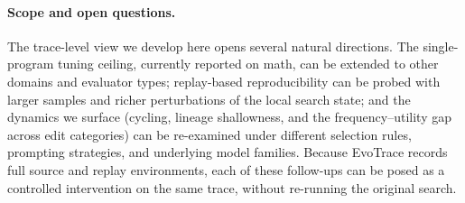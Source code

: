 \paragraph{Scope and open questions.}
The trace-level view we develop here opens several natural directions. The single-program tuning ceiling, currently reported on math, can be extended to other domains and evaluator types; replay-based reproducibility can be probed with larger samples and richer perturbations of the local search state; and the dynamics we surface (cycling, lineage shallowness, and the frequency--utility gap across edit categories) can be re-examined under different selection rules, prompting strategies, and underlying model families. Because EvoTrace records full source and replay environments, each of these follow-ups can be posed as a controlled intervention on the same trace, without re-running the original search.
